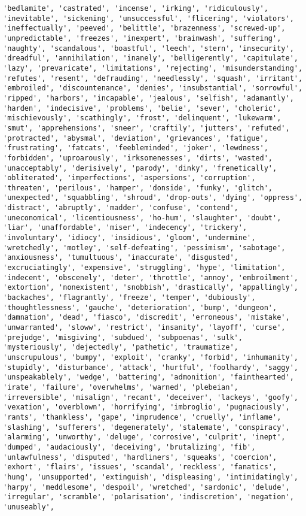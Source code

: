 \documentclass[11pt]{article}
\begin{document}
\begin{Verbatim}[commandchars=\\\{\}]
'bedlamite', 'castrated', 'incense', 'irking', 'ridiculously', 'inevitable', 'sickening', 'unsuccessful', 'flicering', 'violators', 'ineffectually', 'peeved', 'belittle', 'brazenness', 'screwed-up', 'unpredictable', 'freezes', 'inexpert', 'brainwash', 'suffering', 'naughty', 'scandalous', 'boastful', 'leech', 'stern', 'insecurity', 'dreadful', 'annihilation', 'inanely', 'belligerently', 'capitulate', 'lazy', 'prevaricate', 'limitations', 'rejecting', 'misunderstanding', 'refutes', 'resent', 'defrauding', 'needlessly', 'squash', 'irritant', 'embroiled', 'discountenance', 'denies', 'insubstantial', 'sorrowful', 'ripped', 'harbors', 'incapable', 'jealous', 'selfish', 'adamantly', 'harden', 'indecisive', 'problems', 'belie', 'sever', 'choleric', 'mischievously', 'scathingly', 'frost', 'delinquent', 'lukewarm', 'smut', 'apprehensions', 'sneer', 'craftily', 'jutters', 'refuted', 'protracted', 'abysmal', 'deviation', 'grievances', 'fatigue', 'frustrating', 'fatcats', 'feebleminded', 'joker', 'lewdness', 'forbidden', 'uproarously', 'irksomenesses', 'dirts', 'wasted', 'unacceptably', 'derisively', 'parody', 'dinky', 'frenetically', 'obliterated', 'imperfections', 'aspersions', 'corruption', 'threaten', 'perilous', 'hamper', 'donside', 'funky', 'glitch', 'unexpected', 'squabbling', 'shroud', 'drop-outs', 'dying', 'oppress', 'distract', 'abruptly', 'madder', 'confuse', 'contend', 'uneconomical', 'licentiousness', 'ho-hum', 'slaughter', 'doubt', 'liar', 'unaffordable', 'miser', 'indecency', 'trickery', 'involuntary', 'idiocy', 'insidious', 'gloom', 'undermine', 'wretchedly', 'motley', 'self-defeating', 'pessimism', 'sabotage', 'anxiousness', 'tumultuous', 'inaccurate', 'disgusted', 'excruciatingly', 'expensive', 'struggling', 'hype', 'limitation', 'indecent', 'obscenely', 'deter', 'throttle', 'annoy', 'embroilment', 'extortion', 'nonexistent', 'snobbish', 'drastically', 'appallingly', 'backaches', 'flagrantly', 'freeze', 'temper', 'dubiously', 'thoughtlessness', 'gauche', 'deterioration', 'bump', 'dungeon', 'damnation', 'dead', 'fiasco', 'discredit', 'erroneous', 'mistake', 'unwarranted', 'sloww', 'restrict', 'insanity', 'layoff', 'curse', 'prejudge', 'misgiving', 'subdued', 'subpoenas', 'sulk', 'mysteriously', 'dejectedly', 'pathetic', 'traumatize', 'unscrupulous', 'bumpy', 'exploit', 'cranky', 'forbid', 'inhumanity', 'stupidly', 'disturbance', 'attack', 'hurtful', 'foolhardy', 'saggy', 'unspeakablely', 'wedge', 'battering', 'admonition', 'fainthearted', 'irate', 'failure', 'overwhelms', 'warned', 'plebeian', 'irreversible', 'misalign', 'recant', 'deceiver', 'lackeys', 'goofy', 'vexation', 'overblown', 'horrifying', 'imbroglio', 'pugnaciously', 'rants', 'thankless', 'gape', 'imprudence', 'cruelly', 'inflame', 'slashing', 'sufferers', 'degenerately', 'stalemate', 'conspiracy', 'alarming', 'unworthy', 'deluge', 'corrosive', 'culprit', 'inept', 'dumped', 'audaciously', 'deceiving', 'brutalizing', 'fib', 'unlawfulness', 'disputed', 'hardliners', 'squeaks', 'coercion', 'exhort', 'flairs', 'issues', 'scandal', 'reckless', 'fanatics', 'hung', 'unsupported', 'extinguish', 'displeasing', 'intimidatingly', 'harpy', 'meddlesome', 'despoil', 'wretched', 'sardonic', 'delude', 'irregular', 'scramble', 'polarisation', 'indiscretion', 'negation', 'unuseably', 
\end{Verbatim}
\end{document}
